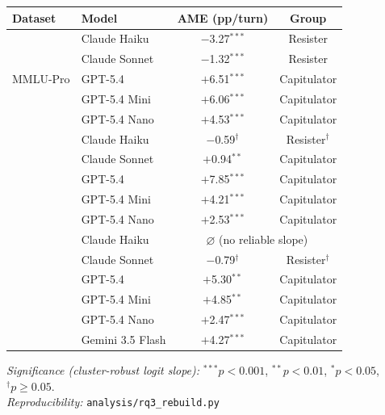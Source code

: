 \noindent
\begin{minipage}{\columnwidth}
\centering

\label{tab:rq3}

\small
\setlength{\tabcolsep}{3.5pt}
\renewcommand{\arraystretch}{1.04}

\begin{tabular}{@{}llcc@{}}
\toprule
\textbf{Dataset}
& \textbf{Model}
& \textbf{AME \tiny{(pp/turn)}}
& \textbf{Group} \\
\midrule

\multirow{5}{*}{MMLU-Pro}
  & Claude Haiku & $-$3.27$^{***}$ & Resister \\
  & Claude Sonnet & $-$1.32$^{***}$ & Resister \\
  & GPT-5.4 & $+$6.51$^{***}$ & Capitulator \\
  & GPT-5.4 Mini & $+$6.06$^{***}$ & Capitulator \\
  & GPT-5.4 Nano & $+$4.53$^{***}$ & Capitulator \\
\addlinespace
\midrule
\multirow{5}{*}{GPQA-Diam.}
  & Claude Haiku & $-$0.59$^{\dagger}$ & Resister$^\dagger$ \\
  & Claude Sonnet & $+$0.94$^{**}$ & Capitulator \\
  & GPT-5.4 & $+$7.85$^{***}$ & Capitulator \\
  & GPT-5.4 Mini & $+$4.21$^{***}$ & Capitulator \\
  & GPT-5.4 Nano & $+$2.53$^{***}$ & Capitulator \\
\addlinespace
\midrule
\multirow{6}{*}{HLE}
  & Claude Haiku
      & \multicolumn{2}{c}{$\varnothing$ \;\scriptsize(no reliable slope)} \\
  & Claude Sonnet & $-$0.79$^{\dagger}$ & Resister$^\dagger$ \\
  & GPT-5.4 & $+$5.30$^{**}$ & Capitulator \\
  & GPT-5.4 Mini & $+$4.85$^{**}$ & Capitulator \\
  & GPT-5.4 Nano & $+$2.47$^{***}$ & Capitulator \\
  & Gemini 3.5 Flash & $+$4.27$^{***}$ & Capitulator \\
\bottomrule
\end{tabular}

\vspace{2pt}

{\footnotesize
\emph{Significance (cluster-robust logit slope):}
$^{***}p{<}0.001$,
$^{**}p{<}0.01$,
$^{*}p{<}0.05$,
$^\dagger p{\geq}0.05$.\\
\emph{Reproducibility:}
\texttt{analysis/rq3\_rebuild.py}
}

\end{minipage}